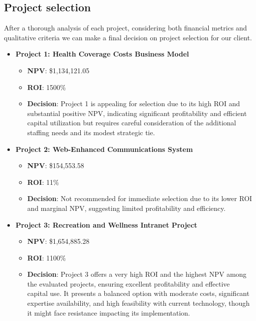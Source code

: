 \subsection{Project selection}

After a thorough analysis of each project, considering both financial metrics and qualitative criteria we can make a final decision on project selection for our client.

\begin{itemize}
    \item \textbf{Project 1: Health Coverage Costs Business Model}
    \begin{itemize}
        \item \textbf{NPV}: \$1,134,121.05
        \item \textbf{ROI}: 1500\%
        \item \textbf{Decision}: Project 1 is appealing for selection due to its high ROI and substantial positive NPV, indicating significant profitability and efficient capital utilization but requires careful consideration of the additional staffing needs and its modest strategic tie.
    \end{itemize}

    \item \textbf{Project 2: Web-Enhanced Communications System}
    \begin{itemize}
        \item \textbf{NPV}: \$154,553.58
        \item \textbf{ROI}: 11\%
        \item \textbf{Decision}: Not recommended for immediate selection due to its lower ROI and marginal NPV, suggesting limited profitability and efficiency.
    \end{itemize}

    \item \textbf{Project 3: Recreation and Wellness Intranet Project}
    \begin{itemize}
        \item \textbf{NPV}: \$1,654,885.28
        \item \textbf{ROI}: 1100\%
        \item \textbf{Decision}: Project 3 offers a very high ROI and the highest NPV among the evaluated projects, ensuring excellent profitability and effective capital use. It presents a balanced option with moderate costs, significant expertise availability, and high feasibility with current technology, though it might face resistance impacting its implementation.
    \end{itemize}
\end{itemize}

